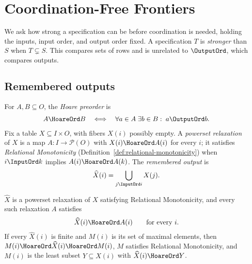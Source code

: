 \section{Coordination-Free Frontiers}
\label{sec:frontiers}

We ask how strong a specification can be before coordination is needed,
holding the inputs, input order, and output order fixed.  A specification $T$
is \emph{stronger} than $S$ when $T\subsetneq S$.  This compares sets of rows
and is unrelated to $\OutputOrd$, which compares outputs.

\subsection{Remembered outputs}

For $A,B\subseteq O$, the \emph{Hoare preorder} is
        \begin{equation}
  A\HoareOrd B
  \quad\Longleftrightarrow\quad
  \forall a\in A\;\exists b\in B:\;a\OutputOrd b.
  \label{eq:lifted-output-order}
        \end{equation}
Fix a table $X\subseteq I\times O$, with fibers $X(i)$ possibly empty.  A
\emph{powerset relaxation} of $X$ is a map $A:I\to\mathcal P(O)$ with
$X(i)\HoareOrd A(i)$ for every $i$; it satisfies \emph{Relational
Monotonicity} (Definition~\ref{def:relational-monotonicity}) when
$i\InputOrd k$ implies $A(i)\HoareOrd A(k)$.  The \emph{remembered output} is
        \begin{equation}
  \widehat X(i)=\bigcup_{j\InputOrd i}X(j).
  \label{eq:monotone-hull}
        \end{equation}

\begin{theorem}
\label{thm:monotone-hull}
$\widehat X$ is a powerset relaxation of $X$ satisfying Relational
Monotonicity, and every such relaxation $A$ satisfies
        \begin{equation}
  \widehat X(i)\HoareOrd A(i)
  \qquad\text{for every }i.
  \label{eq:hull-coverage}
        \end{equation}
If every $\widehat X(i)$ is finite and $M(i)$ is its set of maximal elements,
then $M(i)\HoareOrd\widehat X(i)\HoareOrd M(i)$, $M$ satisfies Relational
Monotonicity, and $M(i)$ is the least subset $Y\subseteq\widehat X(i)$ with
$\widehat X(i)\HoareOrd Y$.
\end{theorem}

